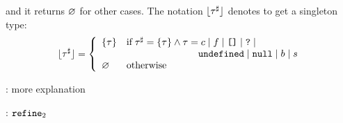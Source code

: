 and it returns $\varnothing$ for other cases.  The notation $\lfloor \tau^\sharp \rfloor$
denotes to get a singleton type:
\[
  \lfloor \aty \rfloor = \left\{
    \begin{array}{ll}
      \{ \ty \} &
      \text{if} \; \aty = \{ \ty \} \wedge \ty = \const \mid \func \mid \clist{}
      \mid \tabsent \mid\\ & \phantom{\text{if}\; \aty = \{ \ty \} \wedge \ty=}
      \undefval \mid \nullval \mid \bool \mid \str\\
      \emp & \text{otherwise}
    \end{array}
  \right.
\]

\todo: more explanation

\todo: $\texttt{refine}_2$
